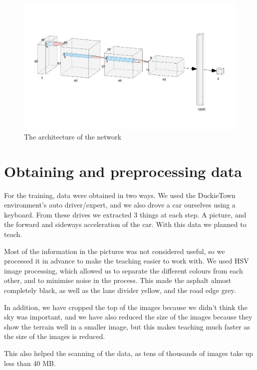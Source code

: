 \documentclass{article}
\begin{document}
\begin{figure}

  \includegraphics[width=\linewidth]{convnet.png}
  \caption{The architecture of the network}

\end{figure}

\section*{Obtaining and preprocessing data}

For the training, data were obtained in two ways. We used the DuckieTown environment's auto driver/expert, and we also drove a car ourselves using a keyboard. From these drives we extracted 3 things at each step. A picture, and the forward and sideways acceleration of the car. With this data we planned to teach.

Most of the information in the pictures was not considered useful, so we processed it in advance to make the teaching easier to work with. We used HSV image processing, which allowed us to separate the different colours from each other, and to minimise noise in the process. This made the asphalt almost completely black, as well as the lane divider yellow, and the road edge grey.

In addition, we have cropped the top of the images because we didn't think the sky was important, and we have also reduced the size of the images because they show the terrain well in a smaller image, but this makes teaching much faster as the size of the images is reduced.

This also helped the scanning of the data, as tens of thousands of images take up less than 40 MB.


\vspace*{2\baselineskip}
\end{document}
